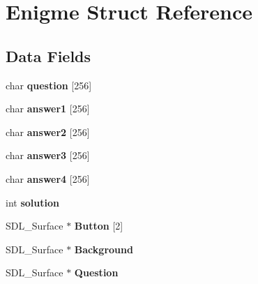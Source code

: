 \hypertarget{structEnigme}{}\section{Enigme Struct Reference}
\label{structEnigme}
\subsection*{Data Fields}
\begin{DoxyCompactItemize}
\item 
\mbox{\label{structEnigme_a49a3f56c837d97e041cf100e35d230e2}} 
char {\bfseries question} \mbox{[}256\mbox{]}
\item 
\mbox{\label{structEnigme_af8fefd1ff1ab98d6171a4862276b3a97}} 
char {\bfseries answer1} \mbox{[}256\mbox{]}
\item 
\mbox{\label{structEnigme_a3600b0e995b2621888ce1e4fd6e5338d}} 
char {\bfseries answer2} \mbox{[}256\mbox{]}
\item 
\mbox{\label{structEnigme_a99d1e744c3e6f90fc2377e401c43155b}} 
char {\bfseries answer3} \mbox{[}256\mbox{]}
\item 
\mbox{\label{structEnigme_a86480a810392975d845be16d7afe3ee6}} 
char {\bfseries answer4} \mbox{[}256\mbox{]}
\item 
\mbox{\label{structEnigme_a22b07264c0f3795a2d9dc99a5028e075}} 
int {\bfseries solution}
\item 
\mbox{\label{structEnigme_ab42d70f221b2b73e1bd1a061132b470d}} 
S\+D\+L\+\_\+\+Surface $\ast$ {\bfseries Button} \mbox{[}2\mbox{]}
\item 
\mbox{\label{structEnigme_a7e712372f47d32a7555e3a423dc851f4}} 
S\+D\+L\+\_\+\+Surface $\ast$ {\bfseries Background}
\item 
\mbox{\label{structEnigme_a82caf85f7598abd1b4c49f61fc8444d6}} 
S\+D\+L\+\_\+\+Surface $\ast$ {\bfseries Question}
\item 
\mbox{\label{structEnigme_a3e80b6f171c8a30ecfb095ede30c9702}} 

\end{DoxyCompactItemize}

